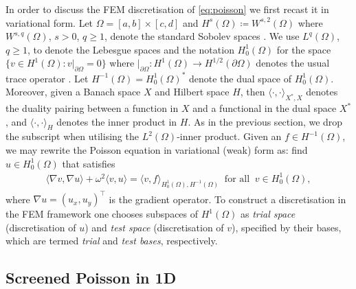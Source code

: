\documentclass[hidelinks,onefignum,onetabnum]{siamart220329}
\begin{document}
In order to discuss the FEM discretisation of \cref{eq:poisson} we  first recast it in variational form. Let $\Omega = [a,b] \times [c,d]$ and $H^s(\Omega) \coloneqq W^{s,2}(\Omega)$ where $W^{s,q}(\Omega)$, $s > 0$, $q \geq 1$, denote the standard Sobolev spaces \cite{Adams2003}. We use $L^q(\Omega)$, $q \geq 1$, to denote the Lebesgue spaces and the notation $H^1_0(\Omega)$ for the space $\{ v \in H^1(\Omega) : v|_{\partial\Omega} = 0\}$ where $|_{\partial \Omega} : H^1(\Omega) \to H^{1/2}( \partial \Omega)$ denotes the usual trace operator \cite{Gagliardo1957}. Let $H^{-1}(\Omega) = H^1_0(\Omega)^*$ denote the dual space of $H^1_0(\Omega)$. Moreover, given a Banach space $X$ and Hilbert space $H$, then $\langle \cdot,  \cdot \rangle_{X^*,X}$ denotes the duality pairing between a function in $X$ and a functional in the dual space
$X^*$, and $\langle \cdot,  \cdot \rangle_{H}$ denotes the inner product in $H$. As in the previous section, we drop the subscript when utilising the $L^2(\Omega)$-inner product. Given an $f \in H^{-1}(\Omega)$, we may rewrite the Poisson equation in variational (weak) form as: find $u \in H^1_0(\Omega)$ that satisfies
\begin{align}
\langle \nabla v, \nabla u \rangle + \omega^2 \langle  v, u \rangle = \langle v, f \rangle_{H^1_0(\Omega), H^{-1}(\Omega)} \;\; \text{for all} \;\; v \in H^1_0(\Omega),
\label{eq:weak-form}
\end{align}
where $\nabla u = (u_x, u_y)^\top$ is the gradient operator. To construct a discretisation in the FEM framework one chooses subspaces of $H^1(\Omega)$ as {\it trial space}  (discretisation of $u$) and {\it  test space} (discretisation of $v$), specified by their bases, which are termed {\it trial} and {\it test bases}, respectively.
 
 \subsection{Screened Poisson in 1D}
 
\end{document}
